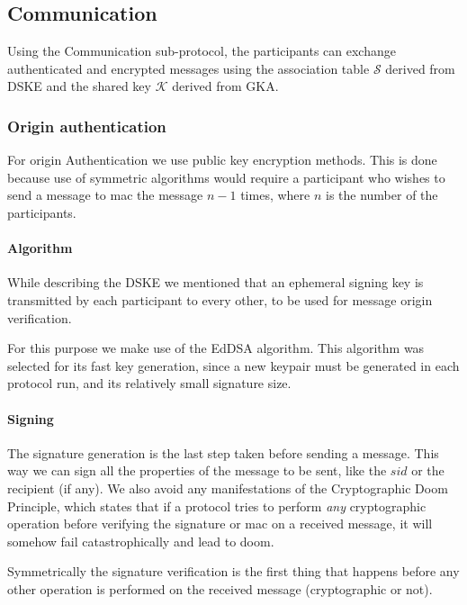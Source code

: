 \begin{algorithm}[t]
  
\end{algorithm}

\subsection{Communication}
\label{subsections:communication}
Using the Communication sub-protocol, the participants can exchange authenticated and encrypted messages using the association table $\mathcal{S}$ derived from DSKE and the shared key $\mathcal{K}$ derived from GKA.

\subsubsection{Origin authentication}
For origin Authentication we use public key encryption methods. This is done because use of symmetric algorithms would require a participant who wishes to send a message to mac the message $n-1$ times, where $n$ is the number of the participants.

\paragraph{Algorithm}
While describing the DSKE we mentioned that an ephemeral signing key is transmitted by each participant to every other, to be used for message origin verification.

For this purpose we make use of the EdDSA algorithm. This algorithm was selected for its fast key generation, since a new keypair must be generated in each protocol run, and its relatively small signature size.

\paragraph{Signing}
\label{signing}
The signature generation is the last step taken before sending a message. This
way we can sign all the properties of the message to be sent, like the $sid$ or the
recipient (if any). We also avoid any manifestations of the Cryptographic Doom
Principle, which states that if a protocol tries to perform \emph{any}
cryptographic operation before verifying the signature or mac on a received
message, it will somehow fail catastrophically and lead to doom.

Symmetrically the signature verification is the first thing that happens before
any other operation is performed on the received message (cryptographic or not).

